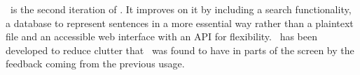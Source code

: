 \boatvtwo\ is the second iteration of \boatvone.
It improves on it by including a search functionality, a database to represent sentences in a more essential way rather than a plaintext file and an accessible web interface with an API for flexibility.
\boatvtwo\ has been developed to reduce clutter that \boatvone\ was found to have in parts of the screen by the feedback coming from the previous \boatvone usage.

